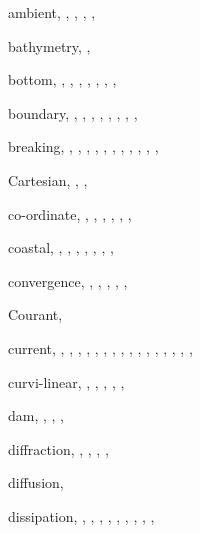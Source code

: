 \documentclass[12pt]{book}
\begin{document}
\begin{theindex}
  \item ambient, , , , 
		, 

  \indexspace

  \item bathymetry, , 
  \item bottom, , , , 
		, , , 
		, 
  \item boundary, , , , 
		, , , 
		, , 
  \item breaking, , , , 
		, , , 
		, , , 
		, , 

  \indexspace

  \item Cartesian, , , 
  \item co-ordinate, , , , 
		, , , 
  \item coastal, , , , 
		, , , 
		, 
  \item convergence, , , 
		, , , 
  \item Courant, 
  \item current, , , , 
		, , , 
		, , , 
		, , , 
		, , , 
		, 
  \item curvi-linear, , , 
		, , , 

  \indexspace

  \item dam, , , , 
  \item diffraction, , , , 
		, 
  \item diffusion, 
  \item dissipation, , , , 
		, , , 
		, , , 


\end{theindex}
\end{document}
